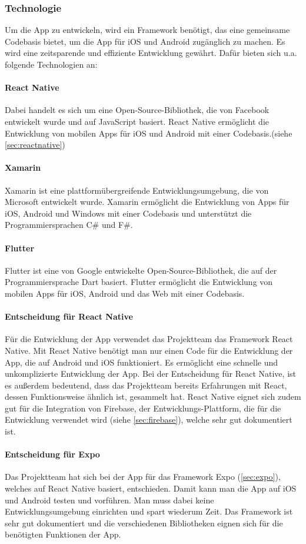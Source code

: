 \subsubsection{Technologie}
Um die App zu entwickeln, wird ein \Gls{Framework} benötigt, das eine gemeinsame Codebasis bietet, um die App für iOS und Android zugänglich zu machen. Es wird eine zeitsparende und effiziente Entwicklung gewährt. Dafür bieten sich u.a. folgende Technologien an:
\bigskip
\paragraph{React Native}
Dabei handelt es sich um eine \Gls{Open-Source}-Bibliothek, die von Facebook entwickelt wurde und auf JavaScript basiert. React Native ermöglicht die Entwicklung von mobilen Apps für iOS und Android mit einer Codebasis.(siehe \ref{sec:reactnative})

\paragraph{Xamarin}
Xamarin ist eine plattformübergreifende Entwicklungsumgebung, die von Microsoft entwickelt wurde. Xamarin ermöglicht die Entwicklung von Apps für iOS, Android und Windows mit einer Codebasis und unterstützt die Programmiersprachen C\# und F\#. 

\paragraph{Flutter}
Flutter ist eine von Google entwickelte \Gls{Open-Source}-Bibliothek, die auf der Programmiersprache Dart basiert. Flutter ermöglicht die Entwicklung von mobilen Apps für iOS, Android und das Web mit einer Codebasis. 
\clearpage
\paragraph{Entscheidung für React Native}
Für die Entwicklung der App verwendet das Projektteam das \Gls{Framework} React Native. Mit React Native benötigt man nur einen Code für die Entwicklung der App, die auf Android und iOS funktioniert. Es ermöglicht eine schnelle und unkomplizierte Entwicklung der App. Bei der Entscheidung für React Native, ist es außerdem bedeutend, dass das Projektteam bereits Erfahrungen mit React, dessen Funktionsweise ähnlich ist, gesammelt hat. React Native eignet sich zudem gut für die Integration von Firebase, der Entwicklungs-Plattform, die für die Entwicklung verwendet wird (siehe \ref{sec:firebase}), welche sehr gut dokumentiert ist. 

\paragraph{Entscheidung für Expo}
\label{sec:entscheidungexpo}
Das Projektteam hat sich bei der App für das \Gls{Framework} Expo (\ref{sec:expo}), welches auf React Native basiert, entschieden. Damit kann man die App auf iOS und Android testen und vorführen. Man muss dabei keine Entwicklungsumgebung einrichten und spart wiederum Zeit. Das \Gls{Framework} ist sehr gut dokumentiert und die verschiedenen Bibliotheken eignen sich für die benötigten Funktionen der App.
\bigskip